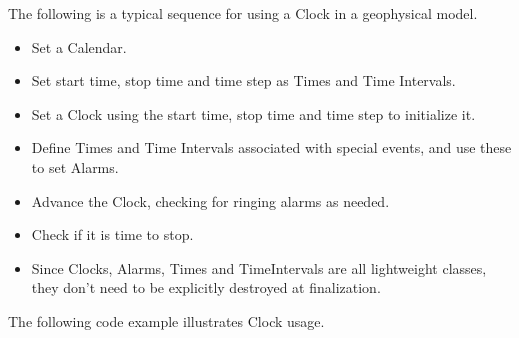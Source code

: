 
The following is a typical sequence for using a Clock in a 
geophysical model.

\begin{itemize}
\item Set a Calendar.
\item Set start time, stop time and time step as Times and 
Time Intervals.
\item Set a Clock using the start time, stop time and time
step to initialize it.
\item Define Times and Time Intervals associated with special
events, and use these to set Alarms.
\end{itemize}

\begin{itemize}
\item Advance the Clock, checking for ringing alarms as needed.
\item Check if it is time to stop.
\end{itemize}

\begin{itemize}
\item Since Clocks, Alarms, Times and TimeIntervals are all lightweight
classes, they don't need to be explicitly destroyed at finalization.
\end{itemize}

The following code example illustrates Clock usage.

